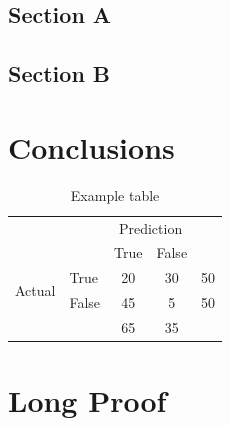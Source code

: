\lipsum[6-8]

\section{Section A}

\lipsum[9]

\section{Section B}

\lipsum[10-11]

\chapter{Conclusions}

\begin{table}
\centering
\caption{Example table}
\begin{tabular}{ll|c|c|c}
\cline{3-4}
                                              &       & \multicolumn{2}{c|}{Prediction} &                         \\ \cline{3-4}
                                              &       & True           & False          &                         \\ \hline
\multicolumn{1}{|c|}{\multirow{2}{*}{Actual}} & True  & 20             & 30             & \multicolumn{1}{l|}{50} \\ \cline{2-5} 
\multicolumn{1}{|c|}{}                        & False & 45             & 5              & \multicolumn{1}{l|}{50} \\ \hline
                                              &       & 65             & 35             &                         \\ \cline{3-4}
\end{tabular}
\end{table}

\lipsum[12-14]



\appendix 
\chapter{Long Proof}
\lipsum[15-24]
